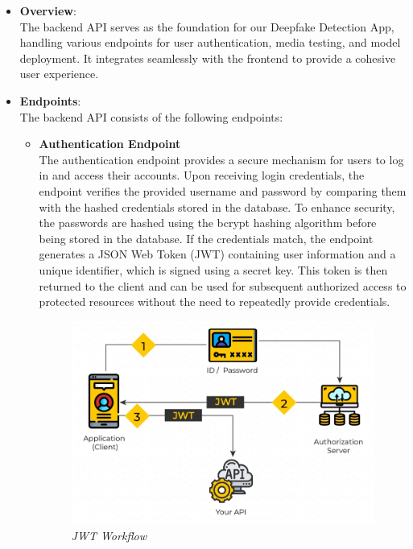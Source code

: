 \begin{itemize}
    \item \textbf{Overview}:\\
          The backend API serves as the foundation for our Deepfake Detection App, handling various endpoints for user authentication, media testing, and model deployment. It integrates seamlessly with the frontend to provide a cohesive user experience.

    \item \textbf{Endpoints}:\\
          The backend API consists of the following endpoints:

          \begin{itemize}

              \item \textbf{Authentication Endpoint}\\
                    The authentication endpoint provides a secure mechanism for users to log in and access their accounts. Upon receiving login credentials, the endpoint verifies the provided username and password by comparing them with the hashed credentials stored in the database. To enhance security, the passwords are hashed using the bcrypt hashing algorithm before being stored in the database. If the credentials match, the endpoint generates a JSON Web Token (JWT) containing user information and a unique identifier, which is signed using a secret key. This token is then returned to the client and can be used for subsequent authorized access to protected resources without the need to repeatedly provide credentials.

                    \begin{figure}[htbp]
                        \centering
                        \includegraphics[width=5in]{img/JSON-Web-Tokens-01.png}
                        \caption{\textit{JWT Workflow}}
                    \end{figure}


\end{itemize}
\end{itemize}
